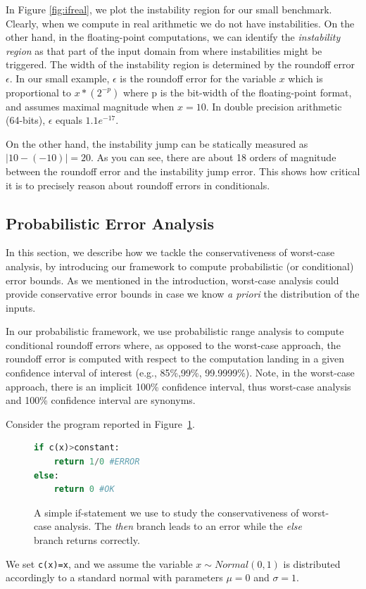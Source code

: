 In Figure \ref{fig:ifreal}, we plot the instability region for our small benchmark. Clearly, when we compute in real arithmetic we do not have instabilities. On the other hand, in the floating-point computations, we can identify the \emph{instability region} as that part of the input domain from where instabilities might be triggered.
%
The width of the instability region is determined by the roundoff error $\epsilon$.
%
In our small example, $\epsilon$ is the roundoff error for the variable $x$ which is proportional to $x*(2^{-p})$ where p is the bit-width of the floating-point format, and assumes maximal magnitude when $x=10$.  
%
In double precision arithmetic (64-bits), $\epsilon$ equals $1.1e^{-17}$.
%

On the other hand, the instability jump can be statically measured as $|10-(-10)|=20$. As you can see, there are about 18 orders of magnitude between the roundoff error and the instability jump error.
%
This shows how critical it is to precisely reason about roundoff errors in conditionals.
 
\subsection{Probabilistic Error Analysis}
\label{sec:prob}
%
In this section, we describe how we tackle the conservativeness of worst-case analysis, by introducing our framework to compute probabilistic (or conditional) error bounds.
%
As we mentioned in the introduction, worst-case analysis could provide conservative error bounds in case we know \emph{a priori} the distribution of the inputs. 
%
%

In our probabilistic framework, we use probabilistic range analysis to compute conditional roundoff errors where, as opposed to the worst-case approach, the roundoff error is computed with respect to the computation landing in a given confidence interval of interest (e.g., 85\%,99\%, 99.9999\%).
%
Note, in the worst-case approach, there is an implicit 100\% confidence interval, thus worst-case analysis and 100\% confidence interval are synonyms.
%

%
Consider the program reported in Figure~\ref{fig:prob}.
%
\begin{figure}[h!]
	\begin{lstlisting}[frame=single, language=Python]
if c(x)>constant:
	return 1/0 #ERROR
else:
	return 0 #OK
	\end{lstlisting}
	\caption{A simple if-statement we use to study the conservativeness of worst-case analysis. The \emph{then} branch leads to an error while the \emph{else} branch returns correctly.}
	\label{fig:prob}
\end{figure}
%
We set \lstinline{c(x)=x}, and we assume the variable $x\sim Normal(0,1)$ is distributed accordingly to a standard normal with parameters $\mu = 0$ and $\sigma = 1$.
%


